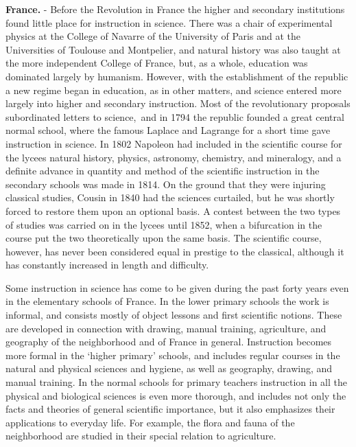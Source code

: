 \documentclass[]{book}
\begin{document}
\textbf{France.} - Before the Revolution in France the higher and secondary institutions found little place for instruction in science. There was a chair of experimental physics at the College of Navarre of the University of Paris and at the Universities of Toulouse and Montpelier, and natural history was also taught at the more independent College of France, but, as a whole, education was dominated largely by humanism. However, with the establishment of the republic a new regime began in education, as in other matters, and science entered more largely into higher and secondary instruction. Most of the revolutionary proposals subordinated letters to science,~and in 1794 the republic founded a great central normal school, where the famous Laplace and Lagrange for a short time gave instruction in science. In 1802 Napoleon had included in the scientific course for the lycees natural history, physics, astronomy, chemistry, and mineralogy, and a definite advance in quantity and method of the scientific instruction in the secondary schools was made in 1814. On the ground that they were injuring classical studies, Cousin in 1840 had the sciences curtailed, but he was shortly forced to restore them upon an optional basis. A contest between the two types of studies was carried on in the lycees until 1852, when a bifurcation in the course put the two theoretically upon the same basis. The scientific course, however, has never been considered equal in prestige to the classical, although it has constantly increased in length and difficulty.

Some instruction in science has come to be given during the past forty years even in the elementary schools of France. In the lower primary schools the work is informal, and consists mostly of object lessons and first scientific notions. These are developed in connection with drawing, manual training, agriculture, and geography of the neighborhood and of France in general. Instruction becomes more formal in the `higher primary' schools, and includes regular courses in the natural and physical sciences and hygiene, as well as geography, drawing, and manual training. In the normal schools for primary teachers instruction in all the physical and biological sciences is even more thorough, and includes not only the facts and theories of general scientific importance, but it also emphasizes their applications to everyday life. For example, the flora and fauna of the neighborhood are studied in their special relation to agriculture.
\end{document}

